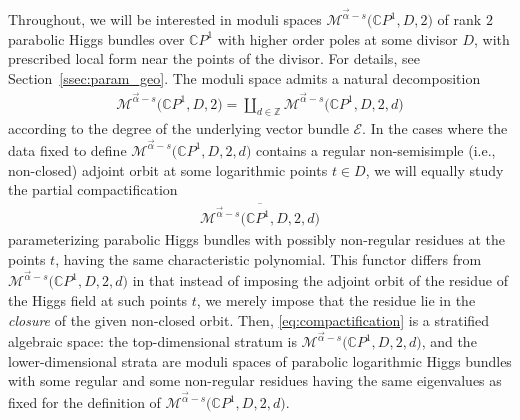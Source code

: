 \documentclass[pdftex]{sigma}
\newcommand{\Z}{{\mathbb Z}} %
\newcommand{\CP}[1]{\mathbb{C}P^{#1}} %
\newcommand{\E}{{\mathcal E}} %
\newcommand{\Mod}{{\mathcal M}} %
\numberwithin{equation}{section}
\begin{document}
Throughout, we will be interested in moduli spaces $\Mod^{\vec{\alpha}-s} \big(\CP1, D, 2\big)$ of rank $2$ parabolic Higgs
bundles over $\CP1$ with higher order poles at some divisor $D$, with prescribed local form near the points of the
divisor. For details, see Section~\ref{ssec:param_geo}. The moduli space admits a natural decomposition
\begin{gather*}
 \Mod^{\vec{\alpha}-s} \big(\CP1, D, 2\big) = \coprod_{d\in\Z} \Mod^{\vec{\alpha}-s} \big(\CP1, D, 2, d\big)
\end{gather*}
according to the degree of the underlying vector bundle $\E$. In the cases where the data fixed to define $\Mod^{\vec{\alpha}-s} \big(\CP1, D, 2, d\big)$
contains a regular non-semisimple (i.e., non-closed) adjoint orbit at some logarithmic points $t\in D$, we will equally study the partial compactification
\begin{gather}\label{eq:compactification}
 \overline{\Mod^{\vec{\alpha}-s} \big(\CP1, D, 2, d\big)}
\end{gather}
parameterizing parabolic Higgs bundles with possibly non-regular residues at the points $t$, having the same characteristic polynomial.
This functor differs from $\Mod^{\vec{\alpha}-s} \big(\CP1, D, 2, d\big)$ in that instead of imposing the adjoint orbit of the residue of the Higgs field
at such points $t$, we merely impose that the residue lie in the \emph{closure} of the given non-closed orbit.
Then, \eqref{eq:compactification} is a stratified algebraic space: the
top-dimensional stratum is $\Mod^{\vec{\alpha}-s} \big(\CP1, D, 2, d\big)$, and
the lower-dimensional strata are moduli spaces of parabolic
logarithmic Higgs bundles with some regular and some non-regular
residues having the same eigenvalues as fixed for the definition of
$\Mod^{\vec{\alpha}-s} \big(\CP1, D, 2,d\big)$.
\end{document}
